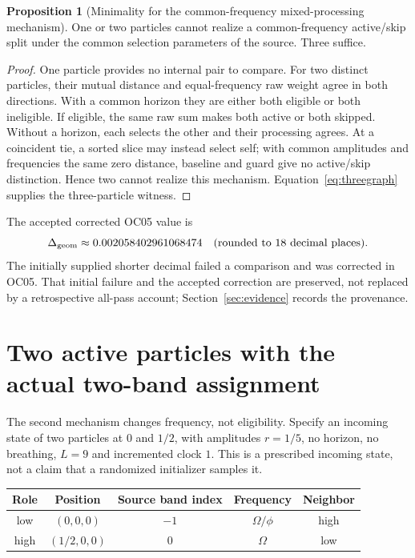 \documentclass[11pt,a4paper]{article}
\theoremstyle{definition}
\newtheorem{proposition}[theorem]{Proposition}
\theoremstyle{remark}\newtheorem{remark}[theorem]{Remark}
\numberwithin{equation}{section}
\begin{document}
\begin{proposition}[Minimality for the common-frequency mixed-processing mechanism]
\label{prop:threeminimal}
One or two particles cannot realize a common-frequency active/skip split under
the common selection parameters of the source. Three suffice.
\end{proposition}
\begin{proof}
One particle provides no internal pair to compare. For two distinct particles,
their mutual distance and equal-frequency raw weight agree in both directions.
With a common horizon they are either both eligible or both ineligible.
If eligible, the same raw sum makes both active or both skipped. Without a horizon,
each selects the other and their processing agrees. At a coincident tie, a sorted
slice may instead select self; with common amplitudes and frequencies the same
zero distance, baseline and guard give no active/skip distinction.
Hence two cannot realize this mechanism. Equation~\eqref{eq:threegraph} supplies
the three-particle witness.
\end{proof}

The accepted corrected OC05 value is
\begin{equation}\label{eq:threenumeric}
 \Delta_{\rm geom}\approx0.002058402961068474
 \quad\hbox{(rounded to 18 decimal places).}
\end{equation}
The initially supplied shorter decimal failed a comparison and was corrected in
OC05. That initial failure and the accepted correction are preserved, not replaced
by a retrospective all-pass account; Section~\ref{sec:evidence} records the provenance.

\section{Two active particles with the actual two-band assignment}\label{sec:bands}
The second mechanism changes frequency, not eligibility. Specify an incoming state
of two particles at $0$ and $1/2$, with amplitudes $r=1/5$, no horizon,
no breathing, $L=9$ and incremented clock $1$. This is a prescribed incoming
state, not a claim that a randomized initializer samples it.

\begin{center}
\begin{tabular}{@{}ccccc@{}}
\toprule Role & Position & Source band index & Frequency & Neighbor\\
\midrule
low & $(0,0,0)$ & $-1$ & $\Omega/\phi$ & high\\
high & $(1/2,0,0)$ & $0$ & $\Omega$ & low\\
\bottomrule
\end{tabular}
\end{center}
\end{document}
